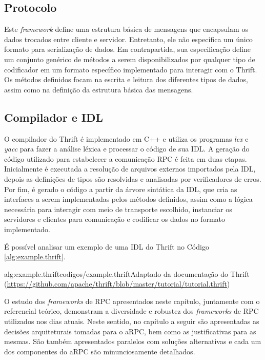 \subsection{Protocolo}
Este \textit{framework} define uma estrutura básica de mensagens que encapsulam os dados trocados entre cliente e servidor. Entretanto, ele não especifica um único formato para serialização de dados. Em contrapartida, sua especificação define um conjunto genérico de métodos a serem disponibilizados por qualquer tipo de codificador em um formato específico implementado para interagir com o Thrift. Os métodos definidos focam na escrita e leitura dos diferentes tipos de dados, assim como na definição da estrutura básica das mensagens.

\subsection{Compilador e IDL}
O compilador do Thrift é implementado em C++ e utiliza os programas \emph{lex} e \emph{yacc} para fazer a análise léxica e processar o código de sua IDL. A geração do código utilizado para estabelecer a comunicação RPC é feita em duas etapas. Inicialmente é executada a resolução de arquivos externos importados pela IDL, depois as definições de tipos são resolvidas e analisadas por verificadores de erros. Por fim, é gerado o código a partir da árvore sintática da IDL, que cria as interfaces a serem implementadas pelos métodos definidos, assim como a lógica necessária para interagir com meio de transporte escolhido, instanciar os servidores e clientes para comunicação e codificar os dados no formato implementado.

É possível analisar um exemplo de uma IDL do Thrift no Código \ref{alg:example.thrift}.

 {alg:example.thrift}{codigos/example.thrift}{Adaptado da documentação do Thrift (\url{https://github.com/apache/thrift/blob/master/tutorial/tutorial.thrift})}

O estudo dos \textit{frameworks} de RPC apresentados neste capítulo, juntamente com o referencial teórico, demonstram a diversidade e robustez dos \textit{frameworks} de RPC utilizados nos dias atuais. Neste sentido, no capítulo a seguir são apresentadas as decisões arquiteturais tomadas para o aRPC, bem como as justificativas para as mesmas. São também apresentados paralelos com soluções alternativas e cada um dos componentes do aRPC são minunciosamente detalhados.
